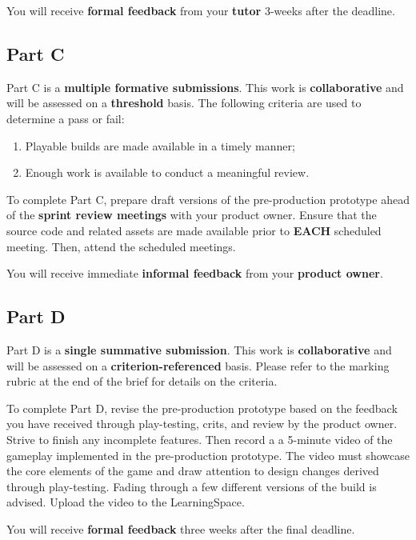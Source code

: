 \documentclass{../../fal_assignment}
\begin{document}
You will receive \textbf{formal feedback} from your \textbf{tutor} 3-weeks after the deadline.

\subsection*{Part C}

Part C is a \textbf{multiple formative submissions}. This work is \textbf{collaborative} and will be assessed on a \textbf{threshold} basis. The following criteria are used to determine a pass or fail:

\begin{enumerate}[label=(\alph*)]
	\item Playable builds are made available in a timely manner;
	\item Enough work is available to conduct a meaningful review.
\end{enumerate}

To complete Part C, prepare draft versions of the pre-production prototype ahead of the \textbf{sprint review meetings} with your product owner. Ensure that the source code and related assets are made available prior to \textbf{EACH} scheduled meeting. Then, attend the scheduled meetings.

You will receive immediate \textbf{informal feedback} from your \textbf{product owner}.

\subsection*{Part D}

Part D is a \textbf{single summative submission}. This work is \textbf{collaborative} and will be assessed on a \textbf{criterion-referenced} basis. Please refer to the marking rubric at the end of the brief for details on the criteria.

To complete Part D, revise the pre-production prototype based on the feedback you have received through play-testing, crits, and review by the product owner. Strive to finish any incomplete features. Then record a a 5-minute video of the gameplay implemented in the pre-production prototype. The video must showcase the core elements of the game and draw attention to design changes derived through play-testing. Fading through a few different versions of the build is advised. Upload the video to the LearningSpace.

You will receive \textbf{formal feedback} three weeks after the final deadline.
\end{document}
